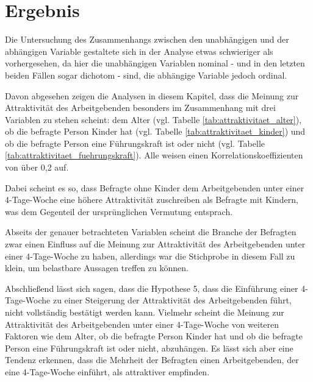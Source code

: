 \section{Ergebnis}

Die Untersuchung des Zusammenhangs zwischen den unabhängigen und der abhängigen Variable gestaltete sich in der Analyse etwas schwieriger als vorhergesehen, 
da hier die unabhängigen Variablen nominal - und in den letzten beiden Fällen sogar dichotom - sind, die abhängige Variable jedoch ordinal.

Davon abgesehen zeigen die Analysen in diesem Kapitel, dass die Meinung zur Attraktivität des Arbeitgebenden besonders im 
Zusammenhang mit drei Variablen zu stehen scheint: dem Alter (vgl. Tabelle \ref{tab:attraktivitaet_alter}), 
ob die befragte Person Kinder hat (vgl. Tabelle \ref{tab:attraktivitaet_kinder}) und ob die befragte Person eine Führungskraft ist 
oder nicht (vgl. Tabelle \ref{tab:attraktivitaet_fuehrungskraft}). Alle weisen einen Korrelationskoeffizienten von über 0,2 auf. 

Dabei scheint es so, dass Befragte ohne Kinder dem Arbeitgebenden unter 
einer 4-Tage-Woche eine höhere Attraktivität zuschreiben als Befragte mit Kindern, was dem Gegenteil der ursprünglichen Vermutung entsprach. 



Abseits der genauer betrachteten Variablen scheint die Branche der Befragten zwar einen Einfluss auf die Meinung zur Attraktivität des Arbeitgebenden unter einer 4-Tage-Woche
zu haben, allerdings war die Stichprobe in diesem Fall zu klein, um belastbare Aussagen treffen zu können.

Abschließend lässt sich sagen, dass die Hypothese 5, dass die Einführung einer 4-Tage-Woche zu einer Steigerung der Attraktivität des Arbeitgebenden führt,
nicht vollständig bestätigt werden kann. Vielmehr scheint die Meinung zur Attraktivität des Arbeitgebenden unter einer 4-Tage-Woche von weiteren Faktoren
wie dem Alter, ob die befragte Person Kinder hat und ob die befragte Person eine Führungskraft ist oder nicht, abzuhängen.
Es lässt sich aber eine Tendenz erkennen, dass die Mehrheit der Befragten einen Arbeitgebenden, der eine 4-Tage-Woche einführt, als attraktiver empfinden.